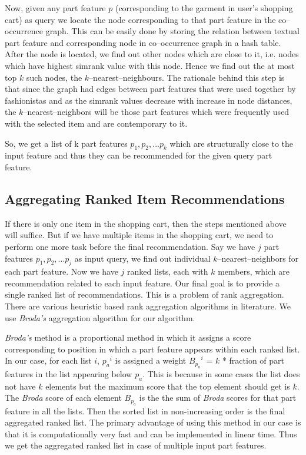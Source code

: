 Now, given any part feature $p$ (corresponding to the garment in user's shopping cart) as query we locate the node corresponding to that part feature in the co--occurrence graph. This can be easily done by storing the relation between textual part feature and corresponding node in co--occurrence graph in a hash table. After the node is located, we find out other nodes which are close to it, i.e. nodes which have highest simrank value with this node. Hence we find out the at most top $k$ such nodes, the $k$--nearest--neighbours. The rationale behind this step is that since the graph had edges between part features that were used together by fashionistas and as the simrank values decrease with increase in node distances, the $k$--nearest--neighbors will be those part features which were frequently used with the selected item and are contemporary to it.

So, we get a list of k part features $p_1, p_2, ... p_k$ which are structurally close to the input feature and thus they can be recommended for the given query part feature.

\subsection{Aggregating Ranked Item Recommendations}

If there is only one item in the shopping cart, then the steps mentioned above will suffice. But if we have multiple items in the shopping cart, we need to perform one more task before the final recommendation. Say we have $j$ part features $p_1, p_2, ... p_j$ as input query, we find out individual $k$--nearest--neighbors for each part feature. Now we have $j$ ranked lists, each with $k$ members, which are recommendation related to each input feature. Our final goal is to provide a single ranked list of recommendations. This is a problem of rank aggregation. There are various heuristic based rank aggregation algorithms in literature. We use \textit{Broda's} aggregation algorithm\cite{rankAggregation} for our algorithm.

\textit{Broda's} method is a proportional method in which it assigns a score corresponding to position in which a part feature appears within each ranked list. In our case, for each list $i$, ${p_a}^i$ is assigned a weight ${B_{p_a}}^i$ = $k$ * fraction of part features in the list appearing below $p_a$. This is because in some cases the list does not have $k$ elements but the maximum score that the top element should get is $k$. The \textit{Broda} score of each element $B_{p_a}$ is the the sum of \textit{Broda} scores for that part feature in all the lists.  Then the sorted list in non-increasing order is the final aggregated ranked list. The primary advantage of using this method in our case is that it is computationally very fast and can be implemented in linear time. Thus we get the aggregated ranked list in case of multiple input part features.

